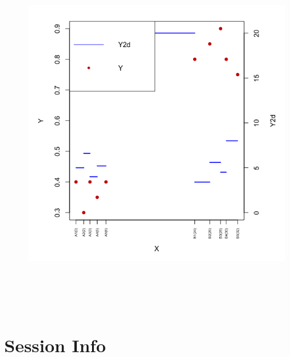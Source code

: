\documentclass[12pt]{article}\usepackage[]{graphicx}\usepackage[usenames,dvipsnames]{color}
\begin{document}
\begin{figure}[htp]
\begin{center}
\includegraphics[width=6in,height=6in]{figure/topic-meta-diversity.png}
\end{center}
\end{figure}

\section{Session Info}
\end{document}
